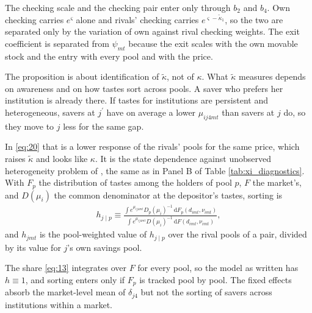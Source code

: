 The checking scale and the checking pair enter only through $b_2$ and $b_4$. Own checking carries $e^{\varsigma}$ alone and rivals' checking carries $e^{\varsigma-\tilde{\kappa}_1}$, so the two are separated only by the variation of own against rival checking weights. The exit coefficient is separated from $\psi_{mt}$ because the exit scales with the own movable stock and the entry with every pool and with the price.

The proposition is about identification of $\tilde{\kappa}$, not of $\kappa$. What $\tilde{\kappa}$ measures depends on awareness and on how tastes sort across pools. A saver who prefers her institution is already there. If tastes for institutions are persistent and heterogeneous, savers at $j^\prime$ have on average a lower $\mu_{ij4mt}$ than savers at $j$ do, so they move to $j$ less for the same gap.

In \eqref{eq:20} that is a lower response of the rivals' pools for the same price, which raises $\tilde{\kappa}$ and looks like $\kappa$. It is the state dependence against unobserved heterogeneity problem of \textcite{heckman1981heterogeneity}, the same as in Panel B of Table \ref{tab:xi_diagnostics}. With $F_p$ the distribution of tastes among the holders of pool $p$, $F$ the market's, and $D(\mu_i)$ the common denominator at the depositor's tastes, sorting is
\begin{gather}
	h_{j\mid p}\equiv\frac{\int e^{\mu_{ij4mt}}D_p(\mu_i)^{-1}\,\text{d}F_p(d_{imt},\nu_{imt})}{\int e^{\mu_{ij4mt}}D(\mu_i)^{-1}\,\text{d}F(d_{imt},\nu_{imt})}, \label{eq:app_sorting}
\end{gather}
and $h_{jmt}$ is the pool-weighted value of $h_{j\mid p}$ over the rival pools of a pair, divided by its value for $j$'s own savings pool.

The share \eqref{eq:13} integrates over $F$ for every pool, so the model as written has $h\equiv1$, and sorting enters only if $F_p$ is tracked pool by pool. The fixed effects absorb the market-level mean of $\delta_{j4}$ but not the sorting of savers across institutions within a market.

